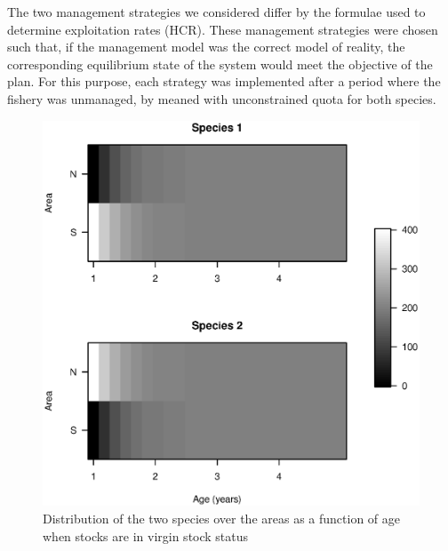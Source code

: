 \documentclass[12pt,oneline,a4paper,numbib]{ouparticle}
\numberwithin{equation}{subsection} %
\begin{document}
The two management strategies we considered differ by the formulae used to determine exploitation rates (HCR). These management strategies were chosen such that, if  the  management  model  was  the  correct  model  of  reality,  the corresponding  equilibrium  state  of  the  system  would  meet  the  objective  of  the  plan. For this purpose, each strategy was implemented after a period where the fishery was unmanaged, by meaned with unconstrained quota for both species.

\begin{figure}[!ht]
\centering
\label{f:distributions}
\includegraphics[width=.69\textwidth]{Figures/distributions.eps} 
\caption{Distribution of the two species over the areas as a function of age when stocks are in virgin stock status }
\end{figure}


\begin{table}[!h]
\centering
\caption{}
\label{scenarios}
\end{table}
 
\end{document}
